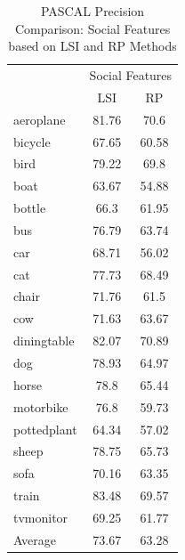 \begin{table}[!ht]
\caption{ PASCAL Precision Comparison: Social Features based on LSI and RP Methods} %
\centering
\begin{tabular}{|p{1.7cm}|c|c|}
 \hline
{\multirow{2}{*}{Labels}} & \multicolumn{2}{|c|}{Social Features} \\
\cline{2-3}
 & LSI & RP \\  [1ex] \hline
aeroplane & 81.76 & 70.6 \\  [1ex] \hline
bicycle & 67.65 & 60.58 \\  [1ex] \hline
bird & 79.22 & 69.8 \\  [1ex] \hline
boat & 63.67 & 54.88 \\  [1ex] \hline
bottle & 66.3 & 61.95 \\  [1ex] \hline
bus & 76.79 & 63.74 \\  [1ex] \hline
car & 68.71 & 56.02 \\  [1ex] \hline
cat & 77.73 & 68.49 \\  [1ex] \hline
chair & 71.76 & 61.5 \\  [1ex] \hline
cow & 71.63 & 63.67 \\  [1ex] \hline
diningtable & 82.07 & 70.89 \\  [1ex] \hline
dog & 78.93 & 64.97 \\  [1ex] \hline
horse & 78.8 & 65.44 \\  [1ex] \hline
motorbike & 76.8 & 59.73 \\  [1ex] \hline
pottedplant & 64.34 & 57.02 \\  [1ex] \hline
sheep & 78.75 & 65.73 \\  [1ex] \hline
sofa & 70.16 & 63.35 \\  [1ex] \hline
train & 83.48 & 69.57 \\  [1ex] \hline
tvmonitor & 69.25 & 61.77 \\  [1ex] \hline
Average & 73.67 & 63.28 \\  [1ex] \hline
\end{tabular}
 \label{PASCAL PrecisionSocialFeatures} %
\end{table}

